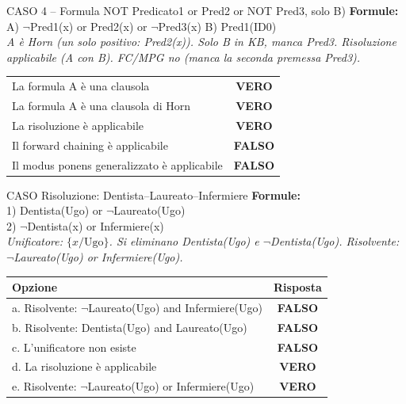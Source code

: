 \documentclass[12pt,a4paper]{article}
\newcommand{\V}{\textcolor{green!55!black}{\textbf{VERO}}}
\newcommand{\F}{\textcolor{red!65!black}{\textbf{FALSO}}}
\begin{document}
\vspace{6pt}

\begin{vftab}{CASO 4 -- Formula NOT Predicato1 or Pred2 or NOT Pred3, solo B)}
\textbf{Formule:} A) $\neg$Pred1(x) or Pred2(x) or $\neg$Pred3(x) \quad B) Pred1(ID0)\\[4pt]
\textit{A è Horn (un solo positivo: Pred2(x)). Solo B in KB, manca Pred3. Risoluzione applicabile (A con B). FC/MPG no (manca la seconda premessa Pred3).}
\begin{center}
\renewcommand{\arraystretch}{1.3}
\begin{tabular}{lc}
\hline
La formula A è una clausola & \V \\
La formula A è una clausola di Horn & \V \\
La risoluzione è applicabile & \V \\
Il forward chaining è applicabile & \F \\
Il modus ponens generalizzato è applicabile & \F \\
\hline
\end{tabular}
\end{center}
\end{vftab}

\vspace{6pt}

\begin{vftab}{CASO Risoluzione: Dentista--Laureato--Infermiere}
\textbf{Formule:}\\
1) Dentista(Ugo) or $\neg$Laureato(Ugo)\\
2) $\neg$Dentista(x) or Infermiere(x)\\[4pt]
\textit{Unificatore: $\{x/\text{Ugo}\}$. Si eliminano Dentista(Ugo) e $\neg$Dentista(Ugo). Risolvente: $\neg$Laureato(Ugo) or Infermiere(Ugo).}
\begin{center}
\renewcommand{\arraystretch}{1.3}
\begin{tabular}{lc}
\hline
\textbf{Opzione} & \textbf{Risposta} \\
\hline
a. Risolvente: $\neg$Laureato(Ugo) and Infermiere(Ugo) & \F \\
b. Risolvente: Dentista(Ugo) and Laureato(Ugo) & \F \\
c. L'unificatore non esiste & \F \\
d. La risoluzione è applicabile & \V \\
e. Risolvente: $\neg$Laureato(Ugo) or Infermiere(Ugo) & \V \\
\hline
\end{tabular}
\end{center}
\end{vftab}
\end{document}
